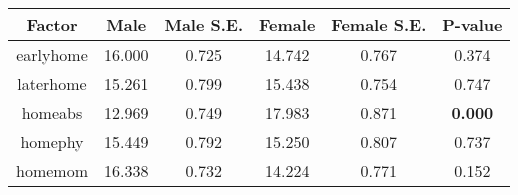 \begin{longtable}{c c c c c c}
\toprule
\textbf{Factor} & \textbf{Male} & \textbf{Male S.E.}  & \textbf{Female} & \textbf{Female S.E.} & \textbf{P-value} \\
\midrule
earlyhome & 16.000 & 0.725 &  14.742 & 0.767 & 0.374 \\
laterhome & 15.261 & 0.799 &  15.438 & 0.754 & 0.747 \\
homeabs & 12.969 & 0.749 &  17.983 & 0.871 & \textbf{0.000} \\
homephy & 15.449 & 0.792 &  15.250 & 0.807 & 0.737 \\
homemom & 16.338 & 0.732 &  14.224 & 0.771 & 0.152 \\
\bottomrule
\end{longtable}
